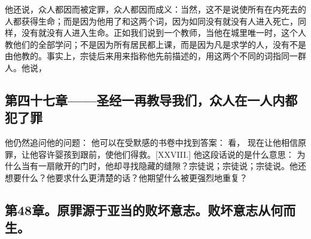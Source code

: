 他还说，众人都因而被定罪，众人都因而成义：当然，这不是说使所有在内死去的人都获得生命；而是因为他用了和这两个词，因为如同没有就没有人进入死亡，同样，没有就没有人进入生命。正如我们说到一个教师，当他在城里唯一时，这个人教他们的全部学问；不是因为所有居民都上课，而是因为凡是求学的人，没有不是由他教的。事实上，宗徒后来用来指称他先前描述的，用这两个不同的词指同一群人。他说， \par


\subsection{第四十七章——圣经一再教导我们，众人在一人内都犯了罪}

他仍然追问他的问题： 他可以在受默感的书卷中找到答案：       看， 现在让他相信原罪，让他容许婴孩到跟前，使他们得救。[XXVIII.] 他这段话说的是什么意思： 为什么当有一扇敞开的门时，他却寻找隐藏的缝隙？宗徒说；宗徒说；宗徒说。他还想要什么？他要求什么更清楚的话？他期望什么被更强烈地重复？\par


\subsection{第48章。原罪源于亚当的败坏意志。败坏意志从何而生。}


